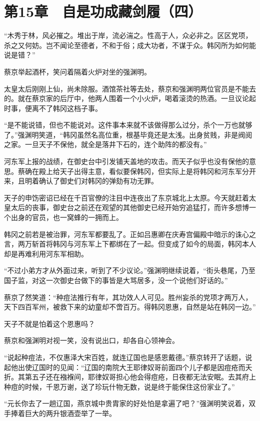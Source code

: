 \section{第15章　自是功成藏剑履（四）}

“木秀于林，风必摧之。堆出于岸，流必湍之。性高于人，众必非之。区区党项，杀之又何妨。岂不闻论至德者，不和于俗；成大功者，不谋于众。韩冈所为如何能说是错？”

蔡京举起酒杯，笑问着隔着火炉对坐的强渊明。

太皇太后刚刚上仙，尚未除服。酒馆茶社等去处，蔡京和强渊明两位官员是不能去的。就在蔡京家的后厅中，他两人围着一个小火炉，喝着滚烫的热酒。一旦议论起时事，便离不了韩冈这档子事。

“是不能说错，但也不能说对。这件事本来就不该做得那么过分，杀个一万也就够了。”强渊明笑道，“韩冈虽然名高位重，根基毕竟还是太浅。出身贫贱，非是阀阅之家。一旦天子不保他，就全是落井下石的，连个助阵的都没有。”

河东军上报的战绩，在御史台中引发铺天盖地的攻击。而天子似乎也没有保他的意思。蔡确在殿上给天子出得主意，看似要保韩冈，但实际上是将韩冈和河东军分开来，且明着确认了御史们对韩冈的弹劾有功无罪。

天子的申饬密诏已经在千百官僚的注目中连夜出了东京城北上太原。今天就赶着太皇太后的丧事，御史台之前还在观望的其他御史已经开始穷追猛打，而许多想博一个出身的官员，也一窝蜂的一拥而上。

韩冈之前若是被治罪，河东军都要乱了。正如吕惠卿在庆寿宫偏殿中暗示的诛心之言，两万斩首将韩冈与河东军上下都绑在了一起。但变成了如今的局面，韩冈本人却是再难利用河东军相助。

“不过小弟方才从外面过来，听到了不少议论。”强渊明继续说着，“街头巷尾，乃至国子监，对这一次御史台做下的事皆是大骂居多，没一个说他们好话的。”

蔡京了然笑道：“种痘法推行有年，其功效人人可见。胜州妄杀的党项才两万人，天下四百军州，被救下来的幼童却不啻百万。得韩冈恩惠，自然是站在韩冈一边。”

天子不就是怕着这个恩惠吗？

蔡京和强渊明对视一笑，没有说出口，却各自心领神会。

“说起种痘法，不仅惠泽大宋百姓，就连辽国也是感恩戴德。”蔡京转开了话题，说起他出使辽国时的见闻：“辽国的南院大王耶律奴哥前面四个儿子都是因痘疮而夭折。其第五子还在襁褓间，耶律奴哥担心他会得痘疮，日夜都无法安眠。去其府上种痘的时候，千恩万谢，送了珍玩什物无数，说是终于能保住这份家业了。”

“元长你去了一趟辽国，燕京城中贵胄家的好处怕是拿遍了吧？”强渊明笑说着，双手捧着巨大的两升银酒壶举了一举。

